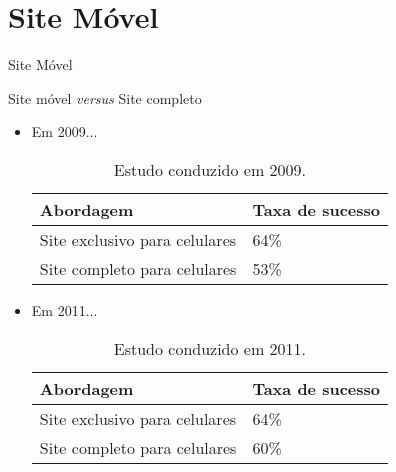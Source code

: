 \section{Site Móvel}

\begin{frame}{Site Móvel}
\begin{block}{Site móvel \emph{versus} Site completo}
  \begin{itemize}

    \item<1->[] Em 2009...
      \begin{table}
        \centering
        \begin{tabular}{ll}
          \toprule
          \textbf{Abordagem}                & \textbf{Taxa de sucesso}\\
          \midrule
          Site exclusivo para celulares     & 64\% \\
          Site completo para celulares      & 53\% \\
          \bottomrule
        \end{tabular}
        \parbox{0.70\textwidth}{\caption{Estudo conduzido em 2009.}}
      \end{table}

    \item<2->[] Em 2011...
      \begin{table}
        \centering
        \begin{tabular}{ll}
          \toprule
          \textbf{Abordagem}                & \textbf{Taxa de sucesso}\\
          \midrule
          Site exclusivo para celulares     & 64\% \\
          Site completo para celulares      & 60\% \\
          \bottomrule
        \end{tabular}
        \parbox{0.70\textwidth}{\caption{Estudo conduzido em 2011.}}
      \end{table}
  \end{itemize}
\end{block}
\end{frame}


